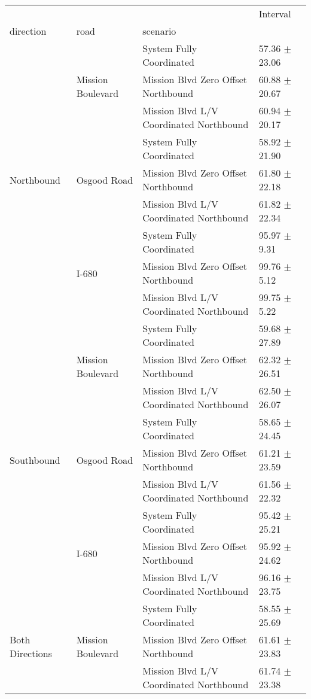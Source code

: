 \begin{tabular}{llll}
\toprule
 &  &  & Interval \\
direction & road & scenario &  \\
\midrule
\multirow[t]{9}{*}{Northbound} & \multirow[t]{3}{*}{Mission Boulevard} & System Fully Coordinated & 57.36 $\pm$ 23.06 \\
 &  & Mission Blvd Zero Offset Northbound & 60.88 $\pm$ 20.67 \\
 &  & Mission Blvd L/V Coordinated Northbound & 60.94 $\pm$ 20.17 \\
 & \multirow[t]{3}{*}{Osgood Road} & System Fully Coordinated & 58.92 $\pm$ 21.90 \\
 &  & Mission Blvd Zero Offset Northbound & 61.80 $\pm$ 22.18 \\
 &  & Mission Blvd L/V Coordinated Northbound & 61.82 $\pm$ 22.34 \\
 & \multirow[t]{3}{*}{I-680} & System Fully Coordinated & 95.97 $\pm$ 9.31 \\
 &  & Mission Blvd Zero Offset Northbound & 99.76 $\pm$ 5.12 \\
 &  & Mission Blvd L/V Coordinated Northbound & 99.75 $\pm$ 5.22 \\
\multirow[t]{9}{*}{Southbound} & \multirow[t]{3}{*}{Mission Boulevard} & System Fully Coordinated & 59.68 $\pm$ 27.89 \\
 &  & Mission Blvd Zero Offset Northbound & 62.32 $\pm$ 26.51 \\
 &  & Mission Blvd L/V Coordinated Northbound & 62.50 $\pm$ 26.07 \\
 & \multirow[t]{3}{*}{Osgood Road} & System Fully Coordinated & 58.65 $\pm$ 24.45 \\
 &  & Mission Blvd Zero Offset Northbound & 61.21 $\pm$ 23.59 \\
 &  & Mission Blvd L/V Coordinated Northbound & 61.56 $\pm$ 22.32 \\
 & \multirow[t]{3}{*}{I-680} & System Fully Coordinated & 95.42 $\pm$ 25.21 \\
 &  & Mission Blvd Zero Offset Northbound & 95.92 $\pm$ 24.62 \\
 &  & Mission Blvd L/V Coordinated Northbound & 96.16 $\pm$ 23.75 \\
\multirow[t]{9}{*}{Both Directions} & \multirow[t]{3}{*}{Mission Boulevard} & System Fully Coordinated & 58.55 $\pm$ 25.69 \\
 &  & Mission Blvd Zero Offset Northbound & 61.61 $\pm$ 23.83 \\
 &  & Mission Blvd L/V Coordinated Northbound & 61.74 $\pm$ 23.38 \\

\end{tabular}
